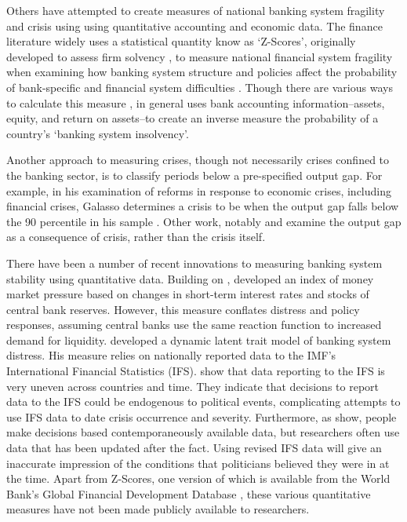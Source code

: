 \documentclass[]{article}
\begin{document}
Others have attempted to create measures of national banking system fragility and crisis using using quantitative accounting and economic data. The finance literature widely uses a statistical quantity know as `Z-Scores', originally developed to assess firm solvency \cite{roy1952}, to measure national financial system fragility when examining how banking system structure and policies affect the probability of bank-specific and financial system difficulties \citep[e.g.][]{beck2013bank,vcihak2010islamic,laeven2009bank,uhde2009}. Though there are various ways to calculate this measure \citep[73]{Lepetit2013}, in general uses bank accounting information--assets, equity, and return on assets--to create an inverse measure the probability of a country's `banking system insolvency'.

Another approach to measuring crises, though not necessarily crises confined to the banking sector, is to classify periods below a pre-specified output gap. For example, in his examination of reforms in response to economic crises, including financial crises, Galasso determines a crisis to be when the output gap falls below the 90 percentile in his sample \citeyearpar[154]{galasso2014}. Other work, notably \cite{laeven2013} and \cite{Reinhart2009} examine the output gap as a consequence of crisis, rather than the crisis itself.

There have been a number of recent innovations to measuring banking system stability using quantitative data. Building on \cite{vonHagen2007}, \cite{Jing2015} developed an index of money market pressure based on changes in short-term interest rates and stocks of central bank reserves. However, this measure conflates distress and policy responses, assuming central banks use the same reaction function to increased demand for liquidity. \cite{Rosas2009} developed a dynamic latent trait model of banking system distress. His measure relies on nationally reported data to the IMF's International Financial Statistics (IFS). \cite{GandrudCopHal2015} show that data reporting to the IFS is very uneven across countries and time. They indicate that decisions to report data to the IFS could be endogenous to political events, complicating attempts to use IFS data to date crisis occurrence and severity. Furthermore, as \cite{KayserLeininger2015} show, people make decisions based contemporaneously available data, but researchers often use data that has been updated after the fact. Using revised IFS data will give an inaccurate impression of the conditions that politicians believed they were in at the time. Apart from Z-Scores, one version of which is available from the World Bank's Global Financial Development Database \citep{worldbank2013}, these various quantitative measures have not been made publicly available to researchers.
\end{document}
